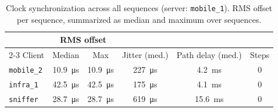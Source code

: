 \begin{table}[t]
\centering
\caption{Clock synchronization across all sequences (server:
\texttt{mobile\_1}). RMS offset per sequence, summarized as median and
maximum over sequences.
}
\label{tab:ntp}
\footnotesize
\begin{tabular}{@{}lccccc@{}}
\toprule
& \multicolumn{2}{c}{RMS offset} & & & \\
\cmidrule(lr){2-3}
Client & Median & Max & Jitter (med.) & Path delay (med.) & Steps \\
\midrule
\texttt{mobile\_2} & \SI{10.9}{\micro\second} & \SI{10.9}{\micro\second} & \SI{227}{\micro\second} & \SI{4.2}{\milli\second}  & 0 \\
\texttt{infra\_1}  & \SI{42.5}{\micro\second} & \SI{42.5}{\micro\second} & \SI{175}{\micro\second} & \SI{4.1}{\milli\second}  & 0 \\
\texttt{sniffer}   & \SI{28.7}{\micro\second} & \SI{28.7}{\micro\second} & \SI{619}{\micro\second} & \SI{15.6}{\milli\second} & 0 \\
\bottomrule
\end{tabular}
\end{table}
